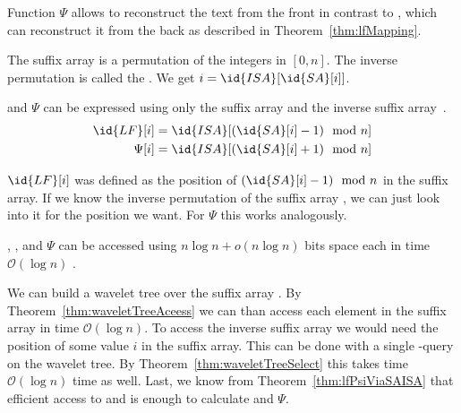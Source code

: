 Function $\Psi$ allows to reconstruct the text from the front in contrast to , which can reconstruct it from the back as described in Theorem~\ref{thm:lfMapping}.

\begin{Definition}
  The suffix array is a permutation of the integers in $[0,n]$. The inverse permutation  is called the . We get $i = \id{ISA}[\id{SA}[i]]$.
\end{Definition}

\begin{Theorem}
  \label{thm:lfPsiViaSAISA}
   and $\Psi$ can be expressed using only the suffix array  and the inverse suffix array~.
  \begin{align}
    \id{LF}[i] &= \id{ISA}[(\id{SA}[i] - 1) \mod n] \\
    \Psi[i] &= \id{ISA}[(\id{SA}[i] + 1) \mod n]
  \end{align}
\end{Theorem}

\begin{Proof}
  $\id{LF}[i]$ was defined as the position of $(\id{SA}[i] - 1) \mod n$ in the suffix array. If we know the inverse permutation of the suffix array , we can just look into it for the position we want. For $\Psi$ this works analogously.
\end{Proof}

\begin{Theorem}
  , ,  and $\Psi$ can be accessed using $n \log n + o(n \log n)$ bits space each in time $\mathcal{O}(\log n)$ .
\end{Theorem}

\begin{Proof}
  We can build a wavelet tree over the suffix array . By Theorem~\ref{thm:waveletTreeAceess} we can than access each element in the suffix array in time $\mathcal{O}(\log n)$. To access the inverse suffix array  we would need the position of some value $i$ in the suffix array. This can be done with a single -query on the wavelet tree. By Theorem~\ref{thm:waveletTreeSelect} this takes time $\mathcal{O}(\log n)$ time as well. Last, we know from Theorem~\ref{thm:lfPsiViaSAISA} that efficient access to  and  is enough to calculate  and $\Psi$.
\end{Proof}


